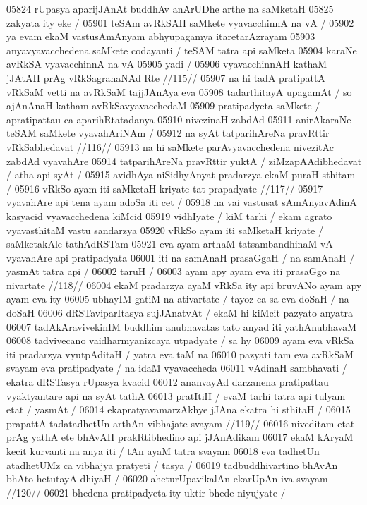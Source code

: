 05824 rUpasya aparijJAnAt buddhAv anArUDhe arthe na saMketaH  
05825 zakyata ity eke /
05901 	teSAm avRkSAH saMkete vyavacchinnA na vA / 
05902 ya evam ekaM vastusAmAnyam abhyupagamya itaretarAzrayam 
05903 anyavyavacchedena saMkete codayanti / teSAM tatra api saMketa 
05904 karaNe avRkSA vyavacchinnA na vA
05905 	yadi /
05906 	vyavacchinnAH kathaM jJAtAH prAg vRkSagrahaNAd Rte //115//  
05907 na hi tadA pratipattA vRkSaM vetti na avRkSaM tajjJAnAya eva
05908 tadarthitayA upagamAt / so ajAnAnaH katham avRkSavyavacchedaM 
05909 pratipadyeta saMkete / apratipattau ca aparihRtatadanya 
05910 nivezinaH zabdAd
05911 	anirAkaraNe teSAM saMkete vyavahAriNAm / 
05912 	na syAt tatparihAreNa pravRttir vRkSabhedavat //116//  
05913 na hi saMkete parAvyavacchedena nivezitAc zabdAd vyavahAre  
05914 tatparihAreNa pravRttir yuktA / ziMzapAAdibhedavat / atha api syAt /
05915 	avidhAya niSidhyAnyat pradarzya ekaM puraH sthitam /  
05916 	vRkSo ayam iti saMketaH kriyate tat prapadyate //117//
05917 	vyavahAre api tena ayam adoSa iti cet / 
05918 na vai vastusat sAmAnyavAdinA kasyacid vyavacchedena kiMcid
05919 vidhIyate / kiM tarhi / ekam agrato vyavasthitaM vastu sandarzya
05920 vRkSo ayam iti saMketaH kriyate / saMketakAle tathAdRSTam 
05921 eva ayam arthaM tatsambandhinaM vA vyavahAre api pratipadyata 
06001 iti na samAnaH prasaGgaH / na samAnaH / yasmAt tatra api / 
06002 	taruH /  
06003 	ayam apy ayam eva iti prasaGgo na nivartate //118//
06004 ekaM pradarzya ayaM vRkSa ity api bruvANo ayam apy ayam eva ity 
06005 ubhayIM gatiM na ativartate / tayoz ca sa eva doSaH / na doSaH  
06006 dRSTaviparItasya sujJAnatvAt / ekaM hi kiMcit pazyato anyatra
06007 tadAkAravivekinIM buddhim anubhavatas tato anyad iti yathAnubhavaM
06008 tadvivecano vaidharmyanizcaya utpadyate / sa hy 
06009 ayam eva vRkSa iti pradarzya vyutpAditaH / yatra eva taM na  
06010 pazyati tam eva avRkSaM svayam eva pratipadyate / na idaM  vyavaccheda
06011 vAdinaH sambhavati / ekatra dRSTasya rUpasya kvacid
06012 ananvayAd darzanena pratipattau vyaktyantare api na syAt tathA  
06013 pratItiH / evaM tarhi tatra api tulyam etat / yasmAt /
06014 	ekapratyavamarzAkhye jJAna ekatra hi sthitaH /
06015 	prapattA tadatadhetUn arthAn vibhajate svayam //119//  
06016 niveditam etat prAg yathA ete bhAvAH prakRtibhedino api jJAnAdikam
06017 ekaM kAryaM kecit kurvanti na anya iti / tAn ayaM tatra svayam 
06018 eva tadhetUn atadhetUMz ca vibhajya pratyeti / tasya / 
06019 	tadbuddhivartino bhAvAn bhAto hetutayA dhiyaH / 
06020 	aheturUpavikalAn ekarUpAn iva svayam //120//
06021 	bhedena pratipadyeta ity uktir bhede niyujyate /
